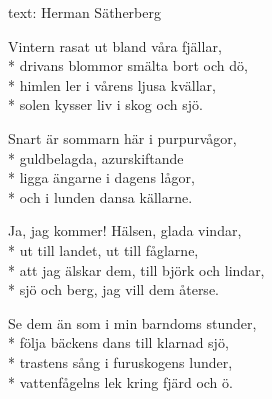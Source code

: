 \begin{SongText}
    \begin{SongInfo}
        text: Herman Sätherberg
    \end{SongInfo}
    \begin{SongVerse}
        Vintern rasat ut bland våra fjällar,\\*%
        drivans blommor smälta bort och dö,\\*%
        himlen ler i vårens ljusa kvällar,\\*%
        solen kysser liv i skog och sjö.
    \end{SongVerse}
    \begin{SongVerse}
        Snart är sommarn här i purpurvågor,\\*%
        guldbelagda, azurskiftande\\*%
        ligga ängarne i dagens lågor,\\*%
        och i lunden dansa källarne.
    \end{SongVerse}
    \begin{SongVerse}
        Ja, jag kommer! Hälsen, glada vindar,\\*%
        ut till landet, ut till fåglarne,\\*%
        att jag älskar dem, till björk och lindar,\\*%
        sjö och berg, jag vill dem återse.
    \end{SongVerse}
    \begin{SongVerse}
        Se dem än som i min barndoms stunder,\\*%
        följa bäckens dans till klarnad sjö,\\*%
        trastens sång i furuskogens lunder,\\*%
        vattenfågelns lek kring fjärd och ö.
    \end{SongVerse}
\end{SongText}
